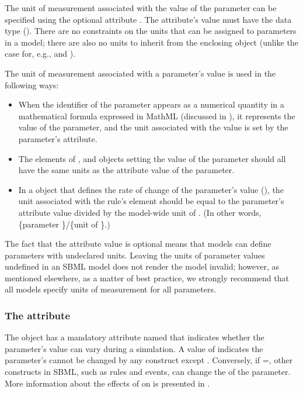 The unit of measurement associated with the value of the parameter
can be specified using the optional attribute .  The
attribute's value must have the data type 
().  There are no constraints on the
units that can be assigned to parameters in a model; there are
also no units to inherit from the enclosing \Model object (unlike
the case for, e.g., \Species and \Compartment).

The unit of measurement associated with a parameter's value is
used in the following ways:
\begin{itemize}

\item When the identifier of the parameter appears as a numerical
  quantity in a mathematical formula expressed in MathML
  (discussed in ), it represents the
  value of the parameter, and the unit associated with the value
  is set by the parameter's  attribute.

\item The  elements of \AssignmentRule,
  \InitialAssignment and \EventAssignment objects setting the
  value of the parameter should all have the same units as the
   attribute value of the parameter.

\item In a \RateRule object that defines the rate of change of the
  parameter's value (), the unit
  associated with the rule's  element should be equal
  to the parameter's  attribute value divided by the
  model-wide unit of .  (In other words,
  \{parameter \}/\{unit of \}.)

\end{itemize}

The fact that the  attribute value is optional means
that models can define parameters with undeclared units.  Leaving
the units of parameter values undefined in an SBML model does not
render the model invalid; however, as mentioned elsewhere, as a
matter of best practice, we strongly recommend that all models
specify units of measurement for all parameters.


\subsubsection{The  attribute}
\label{sec:parameter-constant}

The \Parameter object has a mandatory  attribute named
 that indicates whether the parameter's value can
vary during a simulation.  A value of  indicates the
parameter's  cannot be changed by any construct
except \InitialAssignment.  Conversely, if
=, other constructs in SBML, such as
rules and events, can change the  of the parameter.
More information about the effects of  on
 is presented in .

